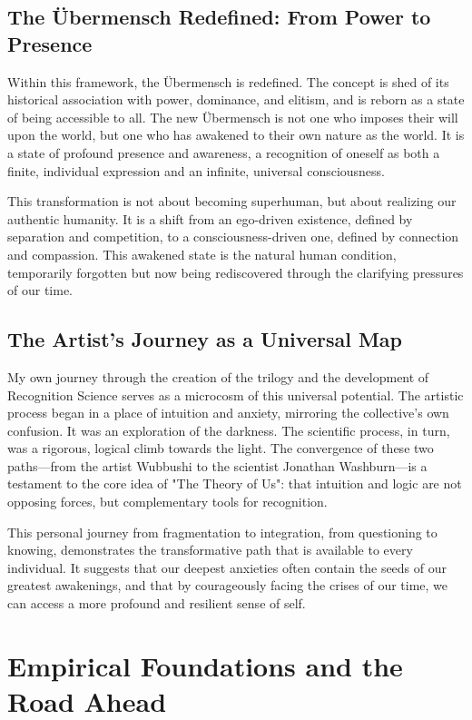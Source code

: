 \documentclass[12pt]{article}
\begin{document}
\subsection{The Übermensch Redefined: From Power to Presence}

Within this framework, the Übermensch is redefined. The concept is shed of its historical association with power, dominance, and elitism, and is reborn as a state of being accessible to all. The new Übermensch is not one who imposes their will upon the world, but one who has awakened to their own nature as the world. It is a state of profound presence and awareness, a recognition of oneself as both a finite, individual expression and an infinite, universal consciousness.

This transformation is not about becoming superhuman, but about realizing our authentic humanity. It is a shift from an ego-driven existence, defined by separation and competition, to a consciousness-driven one, defined by connection and compassion. This awakened state is the natural human condition, temporarily forgotten but now being rediscovered through the clarifying pressures of our time.

\subsection{The Artist's Journey as a Universal Map}

My own journey through the creation of the trilogy and the development of Recognition Science serves as a microcosm of this universal potential. The artistic process began in a place of intuition and anxiety, mirroring the collective's own confusion. It was an exploration of the darkness. The scientific process, in turn, was a rigorous, logical climb towards the light. The convergence of these two paths—from the artist Wubbushi to the scientist Jonathan Washburn—is a testament to the core idea of "The Theory of Us": that intuition and logic are not opposing forces, but complementary tools for recognition.

This personal journey from fragmentation to integration, from questioning to knowing, demonstrates the transformative path that is available to every individual. It suggests that our deepest anxieties often contain the seeds of our greatest awakenings, and that by courageously facing the crises of our time, we can access a more profound and resilient sense of self.

\section{Empirical Foundations and the Road Ahead}
\end{document}

